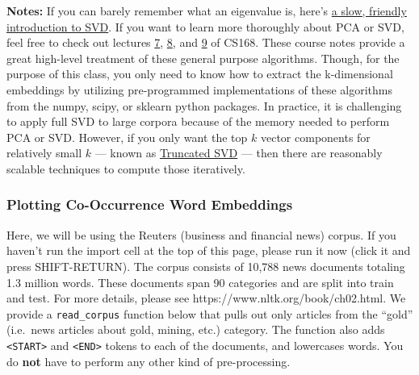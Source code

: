\documentclass[11pt]{article}
\begin{document}
\textbf{Notes:} If you can barely remember what an eigenvalue is, here's
\href{https://davetang.org/file/Singular_Value_Decomposition_Tutorial.pdf}{a
slow, friendly introduction to SVD}. If you want to learn more
thoroughly about PCA or SVD, feel free to check out lectures
\href{https://web.stanford.edu/class/cs168/l/l7.pdf}{7},
\href{http://theory.stanford.edu/%7Etim/s15/l/l8.pdf}{8}, and
\href{https://web.stanford.edu/class/cs168/l/l9.pdf}{9} of CS168. These
course notes provide a great high-level treatment of these general
purpose algorithms. Though, for the purpose of this class, you only need
to know how to extract the k-dimensional embeddings by utilizing
pre-programmed implementations of these algorithms from the numpy,
scipy, or sklearn python packages. In practice, it is challenging to
apply full SVD to large corpora because of the memory needed to perform
PCA or SVD. However, if you only want the top \(k\) vector components
for relatively small \(k\) --- known as
\href{https://en.wikipedia.org/wiki/Singular_value_decomposition#Truncated_SVD}{Truncated
SVD} --- then there are reasonably scalable techniques to compute those
iteratively.

    \subsubsection{Plotting Co-Occurrence Word
Embeddings}\label{plotting-co-occurrence-word-embeddings}

Here, we will be using the Reuters (business and financial news) corpus.
If you haven't run the import cell at the top of this page, please run
it now (click it and press SHIFT-RETURN). The corpus consists of 10,788
news documents totaling 1.3 million words. These documents span 90
categories and are split into train and test. For more details, please
see https://www.nltk.org/book/ch02.html. We provide a
\texttt{read\_corpus} function below that pulls out only articles from
the ``gold'' (i.e.~news articles about gold, mining, etc.) category. The
function also adds \texttt{\textless{}START\textgreater{}} and
\texttt{\textless{}END\textgreater{}} tokens to each of the documents,
and lowercases words. You do \textbf{not} have to perform any other kind
of pre-processing.
\end{document}
